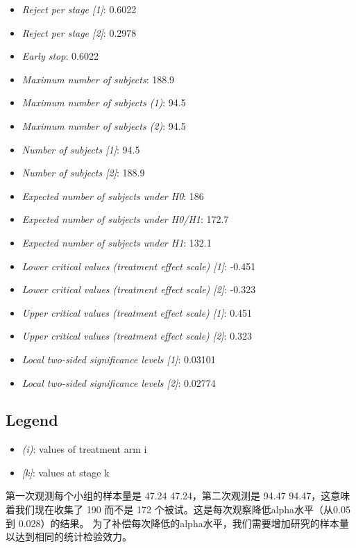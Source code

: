 \documentclass[
  letterpaper,
  DIV=11,
  numbers=noendperiod]{scrreprt}
\providecommand{\tightlist}{%
  \setlength{\itemsep}{0pt}\setlength{\parskip}{0pt}}\usepackage{longtable,booktabs,array}
\begin{document}
\begin{itemize}
\tightlist
\item
  \emph{Reject per stage {[}1{]}}: 0.6022
\item
  \emph{Reject per stage {[}2{]}}: 0.2978
\item
  \emph{Early stop}: 0.6022
\item
  \emph{Maximum number of subjects}: 188.9
\item
  \emph{Maximum number of subjects (1)}: 94.5
\item
  \emph{Maximum number of subjects (2)}: 94.5
\item
  \emph{Number of subjects {[}1{]}}: 94.5
\item
  \emph{Number of subjects {[}2{]}}: 188.9
\item
  \emph{Expected number of subjects under H0}: 186
\item
  \emph{Expected number of subjects under H0/H1}: 172.7
\item
  \emph{Expected number of subjects under H1}: 132.1
\item
  \emph{Lower critical values (treatment effect scale) {[}1{]}}: -0.451
\item
  \emph{Lower critical values (treatment effect scale) {[}2{]}}: -0.323
\item
  \emph{Upper critical values (treatment effect scale) {[}1{]}}: 0.451
\item
  \emph{Upper critical values (treatment effect scale) {[}2{]}}: 0.323
\item
  \emph{Local two-sided significance levels {[}1{]}}: 0.03101
\item
  \emph{Local two-sided significance levels {[}2{]}}: 0.02774
\end{itemize}

\hypertarget{legend-1}{%
\subsection{Legend}\label{legend-1}}

\begin{itemize}
\tightlist
\item
  \emph{(i)}: values of treatment arm i
\item
  \emph{{[}k{]}}: values at stage k
\end{itemize}

第一次观测每个小组的样本量是 47.24 47.24，第二次观测是 94.47
94.47，这意味着我们现在收集了 190 而不是 172
个被试。这是每次观察降低alpha水平（从0.05到 0.028）的结果。
为了补偿每次降低的alpha水平，我们需要增加研究的样本量以达到相同的统计检验效力。
\end{document}
